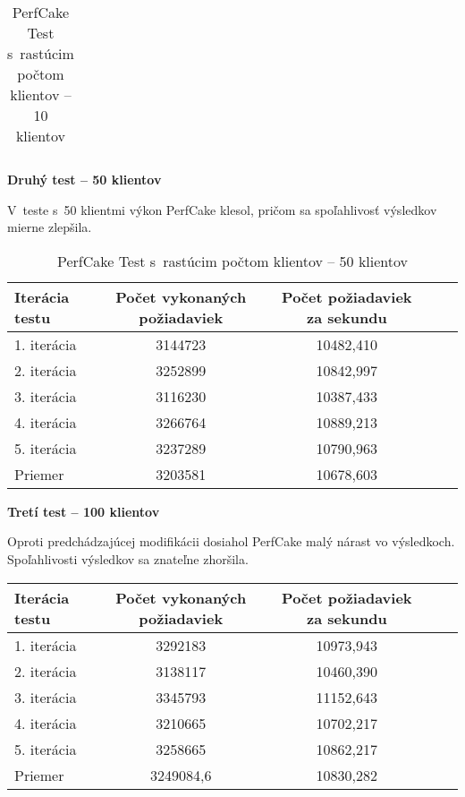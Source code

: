 \documentclass[12pt,oneside,final]{fithesis-utf8}
\begin{document}
\begin{itemize}
\begin{table}[H]
\begin{center}
\begin{tabular}{ | l | c | c | c | c |}
\end{tabular}
\end{center}
\caption{PerfCake Test s~rastúcim počtom klientov -- 10 klientov}
\end{table}


\textbf{Druhý test -- 50 klientov}

V~teste s~50 klientmi výkon PerfCake klesol, pričom sa spoľahlivosť výsledkov mierne zlepšila.

\begin{table}[H]
\begin{center}
\begin{tabular}{ | l | c | c | c | c |}
		\hline
		 \textbf{Iterácia testu} & \textbf{Počet vykonaných požiadaviek} & \textbf{Počet požiadaviek za sekundu} \\ \hline
		 1. iterácia & 3144723 & 10482,410 \\ \hline
		 2. iterácia & 3252899 & 10842,997 \\ \hline
		 3. iterácia & 3116230 & 10387,433 \\ \hline
		 4. iterácia & 3266764 & 10889,213 \\ \hline
		 5. iterácia & 3237289 & 10790,963 \\ \hline
		 Priemer & 3203581 & 10678,603 \\ \hline
		 
\end{tabular}
\end{center}
\caption{PerfCake Test s~rastúcim počtom klientov -- 50 klientov}
\end{table}


\textbf{Tretí test -- 100 klientov}

Oproti predchádzajúcej modifikácii dosiahol PerfCake malý nárast vo výsledkoch. Spoľahlivosti výsledkov sa znateľne zhoršila.

\begin{table}[H]
\begin{center}
\begin{tabular}{ | l | c | c | c | c |}
		\hline
		 \textbf{Iterácia testu} & \textbf{Počet vykonaných požiadaviek} & \textbf{Počet požiadaviek za sekundu} \\ \hline
		 1. iterácia & 3292183 & 10973,943 \\ \hline
		 2. iterácia & 3138117 & 10460,390 \\ \hline
		 3. iterácia & 3345793 & 11152,643 \\ \hline
		 4. iterácia & 3210665 & 10702,217 \\ \hline
		 5. iterácia & 3258665 & 10862,217 \\ \hline
		 Priemer & 3249084,6 & 10830,282 \\ \hline
		 

\end{tabular}
\end{center}
\end{table}
\end{itemize}
\end{document}
